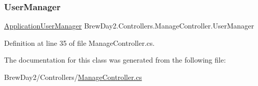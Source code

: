\subsubsection{\texorpdfstring{User\+Manager}{UserManager}}
{\footnotesize\ttfamily \mbox{\hyperlink{class_brew_day2_1_1_application_user_manager}{Application\+User\+Manager}} Brew\+Day2.\+Controllers.\+Manage\+Controller.\+User\+Manager\hspace{0.3cm}{\ttfamily [get]}}



Definition at line 35 of file Manage\+Controller.\+cs.



The documentation for this class was generated from the following file\+:\begin{DoxyCompactItemize}
\item 
Brew\+Day2/\+Controllers/\mbox{\hyperlink{_manage_controller_8cs}{Manage\+Controller.\+cs}}\end{DoxyCompactItemize}
